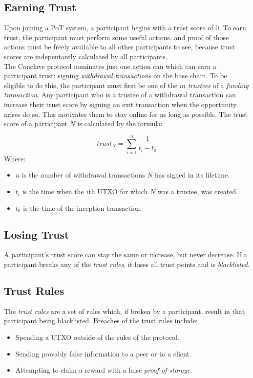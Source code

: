 \documentclass{article}
\begin{document}
\subsection{Earning Trust}

Upon joining a PoT system, a participant begins with a trust score of $0$. To earn trust, the participant must perform some useful actions, and proof of those actions must be freely available to all other participants to see, because trust scores are indepentantly calculated by all participants. \\

The Conclave protocol nominates just one action can which can earn a participant trust: signing \textit{withdrawal transactions} on the base chain. To be eligible to do this, the participant must first be one of the $m$ \textit{trustees} of a \textit{funding transaction}. Any participant who is a trustee of a withdrawal transaction can increase their trust score by signing an exit transaction when the opportunity arises do so. This motivates them to stay online for as long as possible. The trust score of a participant $N$ is calculated by the formula:

\[trust_N = \sum_{i=1}^n\frac{1}{t_i - t_0}\]
Where:
\begin{itemize}
	\item $n$ is the number of withdrawal transactions $N$ has signed in its lifetime.
	\item $t_i$ is the time when the $i$th UTXO for which $N$ was a trustee, was created.
	\item $t_0$ is the time of the inception transaction.
\end{itemize}

\subsection{Losing Trust}

A participant's trust score can stay the same or increase, but never decrease. If a participant breaks any of the \textit{trust rules}, it loses all trust points and is \textit{blacklisted}.

\subsection{Trust Rules}

The \textit{trust rules} are a set of rules which, if broken by a participant, result in that participant being blacklisted. Breaches of the trust rules include:
\begin{itemize}
	\item Spending a UTXO outside of the rules of the protocol.
	\item Sending provably false information to a peer or to a client.
	\item Attempting to claim a reward with a false \textit{proof-of-storage}.
\end{itemize}
	
\end{document}

